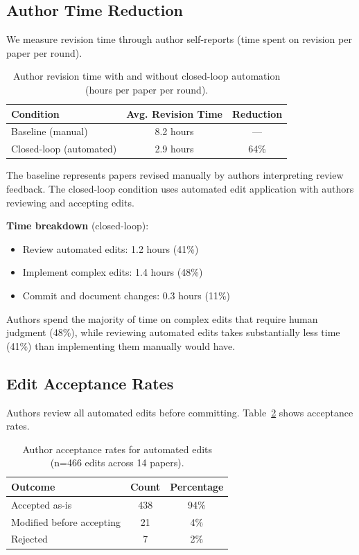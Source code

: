 \subsection{Author Time Reduction}

We measure revision time through author self-reports (time spent on revision per paper per round).

\begin{table}[t]
\centering
\caption{Author revision time with and without closed-loop automation (hours per paper per round).}
\label{tab:time}
\begin{tabular}{lcc}
\toprule
Condition & Avg. Revision Time & Reduction \\
\midrule
Baseline (manual) & 8.2 hours & — \\
Closed-loop (automated) & 2.9 hours & 64\% \\
\bottomrule
\end{tabular}
\end{table}

The baseline represents papers revised manually by authors interpreting review feedback. The closed-loop condition uses automated edit application with authors reviewing and accepting edits.

\textbf{Time breakdown} (closed-loop):
\begin{itemize}
\item Review automated edits: 1.2 hours (41\%)
\item Implement complex edits: 1.4 hours (48\%)
\item Commit and document changes: 0.3 hours (11\%)
\end{itemize}

Authors spend the majority of time on complex edits that require human judgment (48\%), while reviewing automated edits takes substantially less time (41\%) than implementing them manually would have.

\subsection{Edit Acceptance Rates}

Authors review all automated edits before committing. Table~\ref{tab:acceptance} shows acceptance rates.

\begin{table}[t]
\centering
\caption{Author acceptance rates for automated edits (n=466 edits across 14 papers).}
\label{tab:acceptance}
\begin{tabular}{lcc}
\toprule
Outcome & Count & Percentage \\
\midrule
Accepted as-is & 438 & 94\% \\
Modified before accepting & 21 & 4\% \\
Rejected & 7 & 2\% \\
\bottomrule
\end{tabular}
\end{table}

